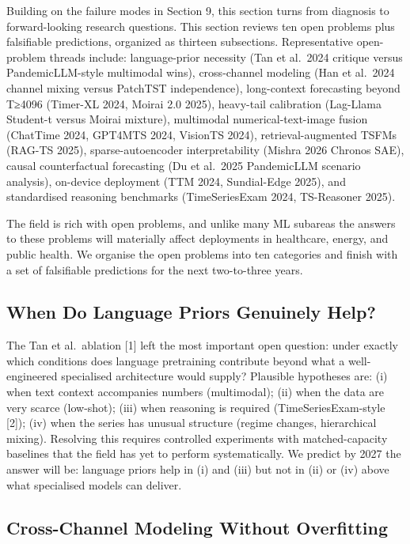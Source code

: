 \documentclass{article}
\begin{document}
Building on the failure modes in Section 9, this section turns from diagnosis to forward-looking research questions. This section reviews ten open problems plus falsifiable predictions, organized as thirteen subsections. Representative open-problem threads include: language-prior necessity (Tan et al.~2024 critique versus PandemicLLM-style multimodal wins), cross-channel modeling (Han et al.~2024 channel mixing versus PatchTST independence), long-context forecasting beyond T≥4096 (Timer-XL 2024, Moirai 2.0 2025), heavy-tail calibration (Lag-Llama Student-t versus Moirai mixture), multimodal numerical-text-image fusion (ChatTime 2024, GPT4MTS 2024, VisionTS 2024), retrieval-augmented TSFMs (RAG-TS 2025), sparse-autoencoder interpretability (Mishra 2026 Chronos SAE), causal counterfactual forecasting (Du et al.~2025 PandemicLLM scenario analysis), on-device deployment (TTM 2024, Sundial-Edge 2025), and standardised reasoning benchmarks (TimeSeriesExam 2024, TS-Reasoner 2025).

The field is rich with open problems, and unlike many ML subareas the answers to these problems will materially affect deployments in healthcare, energy, and public health. We organise the open problems into ten categories and finish with a set of falsifiable predictions for the next two-to-three years.

\subsection{When Do Language Priors Genuinely Help?}\label{when-do-language-priors-genuinely-help}

The Tan et al.~ablation {[}1{]} left the most important open question: under exactly which conditions does language pretraining contribute beyond what a well-engineered specialised architecture would supply? Plausible hypotheses are: (i) when text context accompanies numbers (multimodal); (ii) when the data are very scarce (low-shot); (iii) when reasoning is required (TimeSeriesExam-style {[}2{]}); (iv) when the series has unusual structure (regime changes, hierarchical mixing). Resolving this requires controlled experiments with matched-capacity baselines that the field has yet to perform systematically. We predict by 2027 the answer will be: language priors help in (i) and (iii) but not in (ii) or (iv) above what specialised models can deliver.

\subsection{Cross-Channel Modeling Without Overfitting}\label{cross-channel-modeling-without-overfitting}
\end{document}
